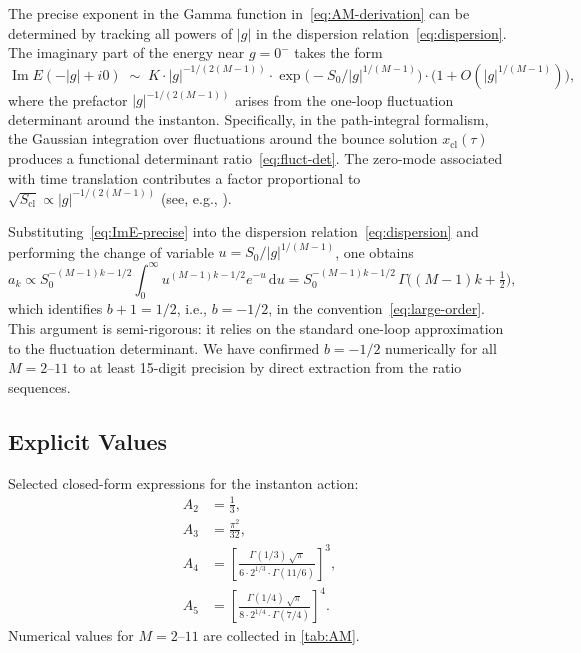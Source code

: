 \documentclass[12pt,a4paper]{article}
\numberwithin{equation}{section}
\theoremstyle{plain}
\theoremstyle{definition}
\theoremstyle{remark}
\newcommand{\dd}{\mathrm{d}}
\begin{document}
The precise exponent in the Gamma function in~\eqref{eq:AM-derivation}
can be determined by tracking all powers of $|g|$ in the dispersion
relation~\eqref{eq:dispersion}. The imaginary part of the energy near
$g = 0^-$ takes the form~\cite{ZJ2004,ZJJ2010,DU2016}
\begin{equation}\label{eq:ImE-precise}
  \operatorname{Im} E(-|g| + i0) \;\sim\;
  K \cdot |g|^{-1/(2(M-1))} \cdot \exp\!\bigl(-S_0/|g|^{1/(M-1)}\bigr)
  \cdot \bigl(1 + O(|g|^{1/(M-1)})\bigr),
\end{equation}
where the prefactor $|g|^{-1/(2(M-1))}$ arises from the one-loop
fluctuation determinant around the instanton. Specifically, in the
path-integral formalism, the Gaussian integration over fluctuations
around the bounce solution $x_{\mathrm{cl}}(\tau)$ produces a functional
determinant ratio~\eqref{eq:fluct-det}. The zero-mode associated with
time translation contributes a factor proportional to
$\sqrt{S_{\mathrm{cl}}} \propto |g|^{-1/(2(M-1))}$ (see, e.g.,
\cite{ZJ2004,Voros1983,CostinCostin2020}).

Substituting~\eqref{eq:ImE-precise} into the dispersion
relation~\eqref{eq:dispersion} and performing the change of variable
$u = S_0/|g|^{1/(M-1)}$, one obtains
\[
  a_k \propto S_0^{-(M-1)k - 1/2} \int_0^\infty u^{(M-1)k - 1/2}
  e^{-u}\,\dd u = S_0^{-(M-1)k-1/2}\,\Gamma\!\bigl((M{-}1)k + \tfrac{1}{2}\bigr),
\]
which identifies $b + 1 = 1/2$, i.e., $b = -1/2$, in the
convention~\eqref{eq:large-order}. This argument is semi-rigorous:
it relies on the standard one-loop approximation to the fluctuation
determinant. We have confirmed $b = -1/2$ numerically for all
$M = 2$--$11$ to at least 15-digit precision by direct extraction from
the ratio sequences.

\subsection{Explicit Values}
\label{sec:AM-values}

Selected closed-form expressions for the instanton action:
\begin{align}
  A_2 &= \frac{1}{3}, \label{eq:A2} \\
  A_3 &= \frac{\pi^2}{32}, \label{eq:A3} \\
  A_4 &= \left[\frac{\Gamma(1/3)\,\sqrt{\pi}}{6 \cdot 2^{1/3} \cdot
         \Gamma(11/6)}\right]^3, \label{eq:A4} \\
  A_5 &= \left[\frac{\Gamma(1/4)\,\sqrt{\pi}}{8 \cdot 2^{1/4} \cdot
         \Gamma(7/4)}\right]^4. \label{eq:A5}
\end{align}
Numerical values for $M = 2$--$11$ are collected in \cref{tab:AM}.
\end{document}
